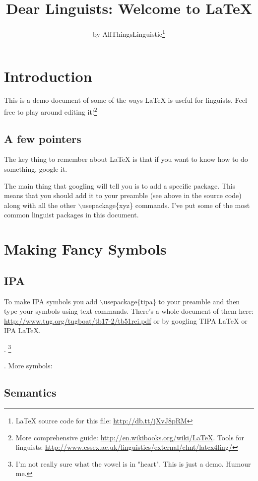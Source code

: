 \documentclass[12pt]{article}
\title{Dear Linguists: Welcome to \LaTeX}
\author{by AllThingsLinguistic\thanks{LaTeX source code for this file: \url{http://db.tt/jXvJ8pRM} }}
\begin{document}
\maketitle


\section{Introduction}

This is a demo document of some of the ways LaTeX is useful for linguists. Feel free to play around editing it!\footnote{More comprehensive guide: \url{http://en.wikibooks.org/wiki/LaTeX}. Tools for linguists: \url{http://www.essex.ac.uk/linguistics/external/clmt/latex4ling/}}


\subsection{A few pointers}

The key thing to remember about LaTeX is that if you want to know how to do something, google it.

The main thing that googling will tell you is to add a specific package. This means that you should add it to your preamble (see above in the source code) along with all the other $\backslash$usepackage\{xyz\} commands. I've put some of the most common linguist packages in this document. 

\section{Making Fancy Symbols}

\subsection{IPA}

To make IPA symbols you add $\backslash$usepackage\{tipa\} to your preamble and then type your symbols using text commands. There's a whole document of them here: \url{http://www.tug.org/tugboat/tb17-2/tb51rei.pdf} or by googling TIPA LaTeX or IPA LaTeX. 

\ex. \footnote{I'm not really sure what the vowel is in "heart". This is just a demo. Humour me.}

\ex. More symbols: \textschwa  \textcrh  {}

\subsection{Semantics}
\end{document}
